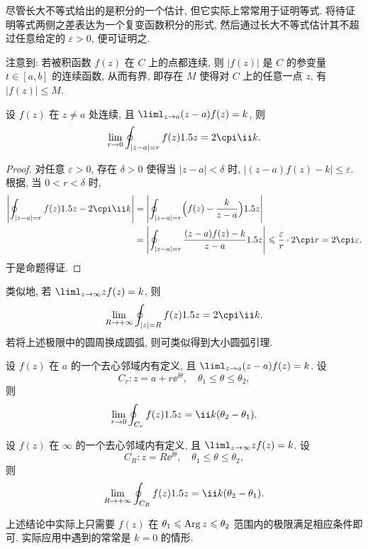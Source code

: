 尽管长大不等式给出的是积分的一个估计, 但它实际上常常用于证明等式.
将待证明等式两侧之差表达为一个复变函数积分的形式, 然后通过长大不等式估计其不超过任意给定的 $\varepsilon>0$, 便可证明之.

注意到: 若被积函数 $f(z)$ 在 $C$ 上的点都连续, 则 $|f(z)|$ 是 $C$ 的参变量 $t\in[a,b]$ 的连续函数, 从而有界, 即存在 $M$ 使得对 $C$ 上的任意一点 $z$, 有 $|f(z)|\le M$.

\begin{example}
  设 $f(z)$ 在 $z\neq a$ 处连续, 且 $\liml_{z\ra a}(z-a)f(z)=k$, 则
  \[
    \lim_{r\ra0}\oint_{|z-a|=r}f(z)\d z=2\cpi\ii k.
  \]
\end{example}

\begin{proof}
  对任意 $\varepsilon>0$, 存在 $\delta>0$ 使得当 $|z-a|<\delta$ 时, $\bigl|(z-a)f(z)-k\bigr|\le\varepsilon$.
  根据, 当 $0<r<\delta$ 时,
  \begin{align*}
      \abs{\oint_{|z-a|=r}f(z)\d z-2\cpi\ii k}&
    =\abs{\oint_{|z-a|=r}\Bigl(f(z)-\frac k{z-a}\Bigr)\d z}\\&
    =\abs{\oint_{|z-a|=r}\frac{(z-a)f(z)-k}{z-a}\d z}
    \le \frac{\varepsilon}r\cdot 2\cpi r
    =2\cpi\varepsilon.
  \end{align*}
  于是命题得证.
\end{proof}

类似地, 若 $\liml_{z\ra \infty} zf(z)=k$, 则
\[
  \lim_{R\ra+\infty}\oint_{|z|=R}f(z)\d z=2\cpi\ii k.
\]
若将上述极限中的圆周换成圆弧, 则可类似得到大小圆弧引理.

\begin{theorem}[大小圆弧引理]
  \label{thm:arc}
  \begin{enuma}
    \item 设 $f(z)$ 在 $a$ 的一个去心邻域内有定义, 且 $\liml_{z\ra a}(z-a)f(z)=k$.
      设
      \[
        C_r: z=a+r\ee^{\ii \theta},\quad \theta_1\le\theta\le\theta_2,
      \]
      则
      \[
        \lim_{r\ra0}\oint_{C_r}f(z)\d z=\ii k(\theta_2-\theta_1).
      \]
    \item 设 $f(z)$ 在 $\infty$ 的一个去心邻域内有定义, 且 $\liml_{z\ra\infty}zf(z)=k$.
      设
      \[
        C_R: z=R\ee^{\ii \theta},\quad \theta_1\le\theta\le\theta_2,
      \]
      则
      \[
        \lim_{R\ra+\infty}\oint_{C_R}f(z)\d z=\ii k(\theta_2-\theta_1).
      \]
  \end{enuma}
\end{theorem}

上述结论中实际上只需要 $f(z)$ 在 $\theta_1\leqslant \operatorname{Arg} z\leqslant \theta_2$ 范围内的极限满足相应条件即可.
实际应用中遇到的常常是 $k=0$ 的情形.



